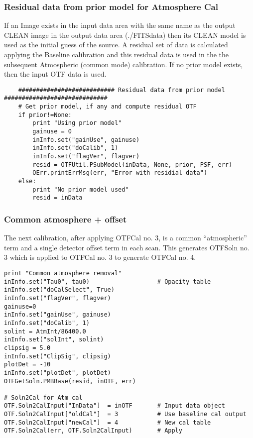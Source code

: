 \documentclass[11pt]{report}
\begin{document}
\subsubsection{Residual data from prior model for Atmosphere Cal}
If an Image exists in the input data area with the same name as the
output CLEAN image in the output data area (./FITSdata) then its CLEAN
model is used as the initial guess of the source.
A residual set of data is calculated applying the Baseline
calibration and this residual data is used in the the subsequent
Atmospheric (common mode) calibration. 
If no prior model exists, then the input OTF data is used.
\begin{verbatim}
    ########################### Residual data from prior model #############################
    # Get prior model, if any and compute residual OTF
    if prior!=None:
        print "Using prior model"
        gainuse = 0
        inInfo.set("gainUse", gainuse)
        inInfo.set("doCalib", 1)
        inInfo.set("flagVer", flagver)
        resid = OTFUtil.PSubModel(inData, None, prior, PSF, err)
        OErr.printErrMsg(err, "Error with residial data")
    else:
        print "No prior model used"
        resid = inData

\end{verbatim}

\subsubsection{Common atmosphere + offset}
The next calibration, after applying OTFCal no. 3, is a common
``atmospheric'' term and a single detector offset term in each scan.
This generates OTFSoln no. 3 which is applied to OTFCal no. 3 to generate
OTFCal no. 4.
\begin{verbatim}
print "Common atmosphere removal"
inInfo.set("Tau0", tau0)                   # Opacity table
inInfo.set("doCalSelect", True)
inInfo.set("flagVer", flagver)
gainuse=0
inInfo.set("gainUse", gainuse)
inInfo.set("doCalib", 1)
solint = AtmInt/86400.0
inInfo.set("solInt", solint)
clipsig = 5.0
inInfo.set("ClipSig", clipsig)
plotDet = -10
inInfo.set("plotDet", plotDet)
OTFGetSoln.PMBBase(resid, inOTF, err)

# Soln2Cal for Atm cal
OTF.Soln2CalInput["InData"]  = inOTF       # Input data object
OTF.Soln2CalInput["oldCal"]  = 3           # Use baseline cal output
OTF.Soln2CalInput["newCal"]  = 4           # New cal table
OTF.Soln2Cal(err, OTF.Soln2CalInput)       # Apply

\end{verbatim}
\end{document}

